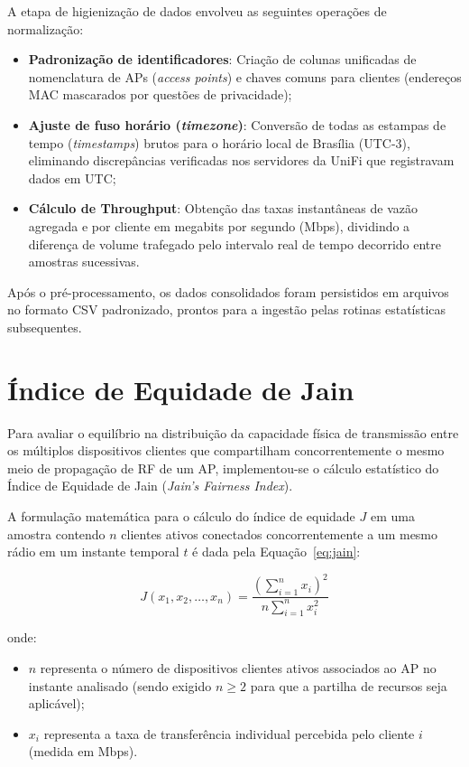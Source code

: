 A etapa de higienização de dados envolveu as seguintes operações de normalização:
\begin{itemize}
	\item \textbf{Padronização de identificadores}: Criação de colunas unificadas de nomenclatura de APs (\textit{access points}) e chaves comuns para clientes (endereços MAC mascarados por questões de privacidade);
	\item \textbf{Ajuste de fuso horário (\textit{timezone})}: Conversão de todas as estampas de tempo (\textit{timestamps}) brutos para o horário local de Brasília (UTC-3), eliminando discrepâncias verificadas nos servidores da UniFi que registravam dados em UTC;
	\item \textbf{Cálculo de Throughput}: Obtenção das taxas instantâneas de vazão agregada e por cliente em megabits por segundo (Mbps), dividindo a diferença de volume trafegado pelo intervalo real de tempo decorrido entre amostras sucessivas.
\end{itemize}

Após o pré-processamento, os dados consolidados foram persistidos em arquivos no formato CSV padronizado, prontos para a ingestão pelas rotinas estatísticas subsequentes.

\section{Índice de Equidade de Jain}
\label{sec:indice_jain}

Para avaliar o equilíbrio na distribuição da capacidade física de transmissão entre os múltiplos dispositivos clientes que compartilham concorrentemente o mesmo meio de propagação de RF de um AP, implementou-se o cálculo estatístico do Índice de Equidade de Jain (\textit{Jain's Fairness Index}).

A formulação matemática para o cálculo do índice de equidade $J$ em uma amostra contendo $n$ clientes ativos conectados concorrentemente a um mesmo rádio em um instante temporal $t$ é dada pela Equação~\ref{eq:jain}:

\begin{equation}
\label{eq:jain}
J(x_1, x_2, \dots, x_n) = \frac{\left( \sum_{i=1}^{n} x_i \right)^2}{n \sum_{i=1}^{n} x_i^2}
\end{equation}

onde:
\begin{itemize}
	\item $n$ representa o número de dispositivos clientes ativos associados ao AP no instante analisado (sendo exigido $n \ge 2$ para que a partilha de recursos seja aplicável);
	\item $x_i$ representa a taxa de transferência individual percebida pelo cliente $i$ (medida em Mbps).
\end{itemize}

